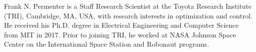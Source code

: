 \begin{IEEEbiography}{Frank
N. Permenter} is a Staff Research Scientist at the Toyota Research Institute
(TRI), Cambridge, MA, USA, with research interests in optimization and control.
He received his Ph.D. degree in Electrical Engineering and Computer Science from
MIT in 2017. Prior to joining TRI, he worked at NASA Johnson Space Center on the
International Space Station and Robonaut programs.
\end{IEEEbiography}
